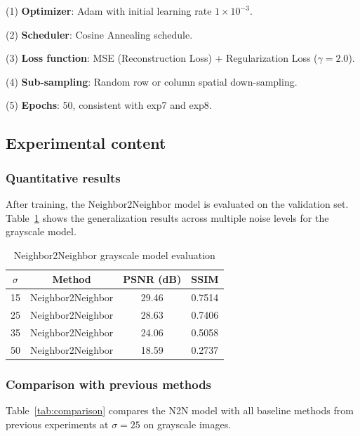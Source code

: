\documentclass[twocolumn, a4paper, 10pt]{article}
\begin{document}
(1) \textbf{Optimizer}: Adam with initial learning rate $1 \times 10^{-3}$.

(2) \textbf{Scheduler}: Cosine Annealing schedule.

(3) \textbf{Loss function}: MSE (Reconstruction Loss) + Regularization Loss ($\gamma = 2.0$).

(4) \textbf{Sub-sampling}: Random row or column spatial down-sampling.

(5) \textbf{Epochs}: 50, consistent with exp7 and exp8.

\subsection{Experimental content}

\subsubsection{Quantitative results}

After training, the Neighbor2Neighbor model is evaluated on the validation set. Table~\ref{tab:gray} shows the generalization results across multiple noise levels for the grayscale model.

\begin{table}[htbp]
\caption{Neighbor2Neighbor grayscale model evaluation}
\begin{center}
\begin{tabular}{cccc}
\toprule
\textbf{$\sigma$} & \textbf{Method} & \textbf{PSNR (dB)} & \textbf{SSIM} \\
\midrule
15 & Neighbor2Neighbor & 29.46 & 0.7514 \\
25 & Neighbor2Neighbor & 28.63 & 0.7406 \\
35 & Neighbor2Neighbor & 24.06 & 0.5058 \\
50 & Neighbor2Neighbor & 18.59 & 0.2737 \\
\bottomrule
\end{tabular}
\label{tab:gray}
\end{center}
\end{table}

\subsubsection{Comparison with previous methods}

Table~\ref{tab:comparison} compares the N2N model with all baseline methods from previous experiments at $\sigma=25$ on grayscale images.
\end{document}
